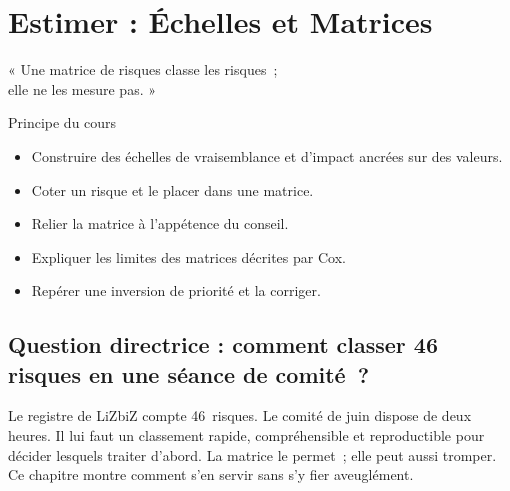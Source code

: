 
\chapter{Estimer : Échelles et Matrices}
\label{chap:matrices}

\epigraph{%
    « Une matrice de risques classe les risques~;\\
    elle ne les mesure pas. »%
}{Principe du cours}


\begin{boxobjectifs}
\begin{itemize}
    \item Construire des échelles de vraisemblance et d'impact ancrées sur
          des valeurs.
    \item Coter un risque et le placer dans une matrice.
    \item Relier la matrice à l'appétence du conseil.
    \item Expliquer les limites des matrices décrites par Cox.
    \item Repérer une inversion de priorité et la corriger.
\end{itemize}
\end{boxobjectifs}

\bigskip

\section*{Question directrice : comment classer 46 risques en une séance de comité~?}

Le registre de LiZbiZ compte 46~risques. Le comité de juin dispose de deux
heures. Il lui faut un classement rapide, compréhensible et reproductible
pour décider lesquels traiter d'abord. La matrice le permet~; elle peut
aussi tromper. Ce chapitre montre comment s'en servir sans s'y fier
aveuglément.

